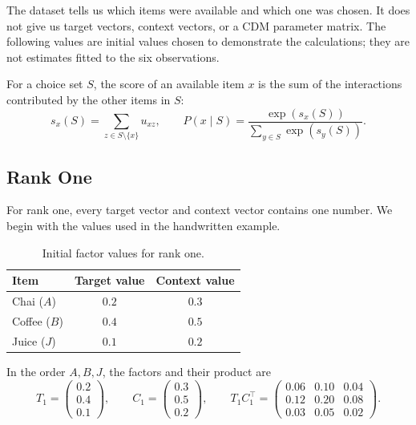 \documentclass[12pt,oneside]{report}
\begin{document}
The dataset tells us which items were available and which
one was chosen. It does not give us target vectors, context
vectors, or a CDM parameter matrix. The following values
are initial values chosen to demonstrate the calculations;
they are not estimates fitted to the six observations.

For a choice set $S$, the score of an available item $x$
is the sum of the interactions contributed by the other
items in $S$:
\begin{equation}
    s_x(S)=\sum_{z\in S\setminus\{x\}}u_{xz},
    \qquad
    P(x\mid S)=
    \frac{\exp(s_x(S))}
    {\sum_{y\in S}\exp(s_y(S))}.
    \label{eq:low-rank-score-probability}
\end{equation}

\subsection{Rank One}

For rank one, every target vector and context vector
contains one number. We begin with the values used in
the handwritten example.

\begin{table}[htbp]
    \centering
    \caption{Initial factor values for rank one.}
    \label{tab:low-rank-one-factors}
    \begin{tabular}{lcc}
        \toprule
        Item & Target value & Context value\\
        \midrule
        Chai ($A$)   & $0.2$ & $0.3$\\
        Coffee ($B$) & $0.4$ & $0.5$\\
        Juice ($J$)  & $0.1$ & $0.2$\\
        \bottomrule
    \end{tabular}
\end{table}

In the order $A,B,J$, the factors and their product are
\begin{equation}
    T_1=
    \begin{pmatrix}0.2\\0.4\\0.1\end{pmatrix},
    \qquad
    C_1=
    \begin{pmatrix}0.3\\0.5\\0.2\end{pmatrix},
    \qquad
    T_1C_1^\top=
    \begin{pmatrix}
        0.06 & 0.10 & 0.04\\
        0.12 & 0.20 & 0.08\\
        0.03 & 0.05 & 0.02
    \end{pmatrix}.
    \label{eq:rank-one-example-product}
\end{equation}
\end{document}
